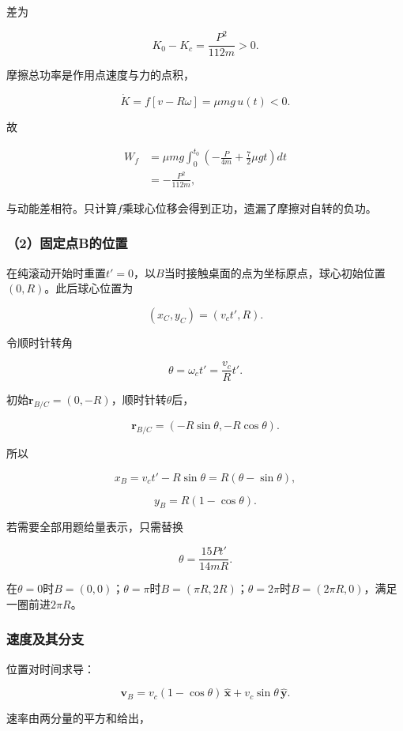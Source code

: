 \documentclass[12pt,a4paper,fontset=fandol]{ctexart}
\begin{document}
差为

\[
\boxed{K_0-K_c=\frac{P^2}{112m}>0}.
\]

摩擦总功率是作用点速度与力的点积，

\[
\dot K=f[v-R\omega]=\mu mg\,u(t)<0.
\]

故

\[
\begin{aligned}
W_f&=\mu mg\int_0^{t_0}
\left(-\frac P{4m}+\frac72\mu gt\right)dt\\
&=-\frac{P^2}{112m},
\end{aligned}
\]

与动能差相符。只计算\(f\)乘球心位移会得到正功，遗漏了摩擦对自转的负功。

\subsubsection{（2）固定点B的位置}\label{ux56faux5b9aux70b9bux7684ux4f4dux7f6e}

在纯滚动开始时重置\(t'=0\)，以\(B\)当时接触桌面的点为坐标原点，球心初始位置\((0,R)\)。此后球心位置为

\[
(x_C,y_C)=(v_ct',R).
\]

令顺时针转角

\[
\theta=\omega_ct'=\frac{v_c}{R}t'.
\]

初始\(\mathbf r_{B/C}=(0,-R)\)，顺时针转\(\theta\)后，

\[
\mathbf r_{B/C}=(-R\sin\theta,-R\cos\theta).
\]

所以

\[
\boxed{
x_B=v_ct'-R\sin\theta
=R(\theta-\sin\theta)},
\]

\[
\boxed{y_B=R(1-\cos\theta)}.
\]

若需要全部用题给量表示，只需替换

\[
\theta=\frac{15Pt'}{14mR}.
\]

在\(\theta=0\)时\(B=(0,0)\)；\(\theta=\pi\)时\(B=(\pi R,2R)\)；\(\theta=2\pi\)时\(B=(2\pi R,0)\)，满足一圈前进\(2\pi R\)。

\subsubsection{速度及其分支}\label{ux901fux5ea6ux53caux5176ux5206ux652f}

位置对时间求导：

\[
\boxed{
\mathbf v_B=
v_c(1-\cos\theta)\,\hat{\mathbf x}
+v_c\sin\theta\,\hat{\mathbf y}}.
\]

速率由两分量的平方和给出，
\end{document}
